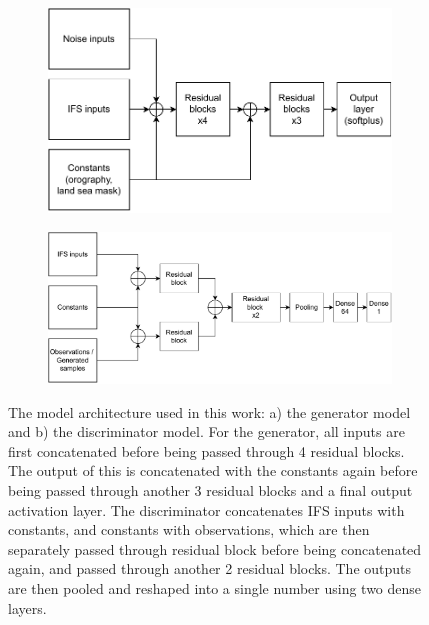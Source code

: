 \documentclass{article}
\begin{document}
     
\begin{figure}[h]
    \begin{subfigure}[c]{0.48\textwidth}
    \centering
        \includegraphics[width=\textwidth]{images/generator_2.drawio.pdf}
        \caption{}
        \centering
    \end{subfigure}
    \hfill
    \begin{subfigure}[c]{0.48\textwidth}
        \includegraphics[width=\textwidth]{images/discriminator.drawio.pdf}
        \caption{}
        \centering
    \end{subfigure}
     \caption{The model architecture used in this work: a) the generator model and b) the discriminator model. For the generator, all inputs are first concatenated before being passed through 4 residual blocks. The output of this is concatenated with the constants again before being passed through another 3 residual blocks and a final output activation layer. The discriminator concatenates IFS inputs with constants, and constants with observations, which are then separately passed through residual block before being concatenated again, and passed through another 2 residual blocks. The outputs are then pooled and reshaped into a single number using two dense layers.}
    \label{fig:resnet}
\end{figure}    
\end{document}

